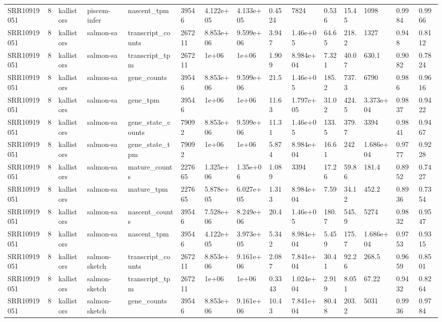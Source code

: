 \begin{tabular}{lllllllllllllll}
SRR10919051 & 8 & kallistors & piscem-infer & nascent\_tpm & 39546 & 4.122e+05 & 4.133e+05 & 0.4524 & 7824 & 0.536 & 15.45 & 1098 & 0.9984 & 0.9966 \\
SRR10919051 & 8 & kallistors & salmon-sa & transcript\_counts & 267211 & 8.853e+06 & 9.599e+06 & 3.947 & 1.46e+05 & 64.65 & 218.2 & 1327 & 0.948 & 0.8112 \\
SRR10919051 & 8 & kallistors & salmon-sa & transcript\_tpm & 267211 & 1e+06 & 1e+06 & 1.909 & 8.984e+04 & 7.321 & 40.07 & 630.1 & 0.9082 & 0.7824 \\
SRR10919051 & 8 & kallistors & salmon-sa & gene\_counts & 39546 & 8.853e+06 & 9.599e+06 & 21.5 & 1.46e+05 & 185.2 & 737.3 & 6790 & 0.986 & 0.9616 \\
SRR10919051 & 8 & kallistors & salmon-sa & gene\_tpm & 39546 & 1e+06 & 1e+06 & 11.63 & 1.797e+05 & 31.02 & 424.5 & 3.373e+04 & 0.9837 & 0.9422 \\
SRR10919051 & 8 & kallistors & salmon-sa & gene\_state\_counts & 79092 & 8.853e+06 & 9.599e+06 & 11.31 & 1.46e+05 & 133.5 & 379.7 & 3394 & 0.9841 & 0.9467 \\
SRR10919051 & 8 & kallistors & salmon-sa & gene\_state\_tpm & 79092 & 1e+06 & 1e+06 & 5.874 & 8.984e+04 & 16.61 & 242 & 1.686e+04 & 0.9777 & 0.9228 \\
SRR10919051 & 8 & kallistors & salmon-sa & mature\_counts & 227665 & 1.325e+06 & 1.35e+06 & 1.089 & 3394 & 17.26 & 59.86 & 181.4 & 0.8952 & 0.7427 \\
SRR10919051 & 8 & kallistors & salmon-sa & mature\_tpm & 227665 & 5.878e+05 & 6.027e+05 & 1.313 & 8.984e+04 & 7.59 & 34.12 & 452.2 & 0.8936 & 0.7354 \\
SRR10919051 & 8 & kallistors & salmon-sa & nascent\_counts & 39546 & 7.528e+06 & 8.249e+06 & 20.4 & 1.46e+05 & 180.7 & 545.9 & 5274 & 0.9832 & 0.9547 \\
SRR10919051 & 8 & kallistors & salmon-sa & nascent\_tpm & 39546 & 4.122e+05 & 3.973e+05 & 5.342 & 8.984e+04 & 5.459 & 175.7 & 1.686e+04 & 0.9753 & 0.9315 \\
SRR10919051 & 8 & kallistors & salmon-sketch & transcript\_counts & 267211 & 8.853e+06 & 9.161e+06 & 2.087 & 7.841e+04 & 30.41 & 92.26 & 268.5 & 0.9659 & 0.8501 \\
SRR10919051 & 8 & kallistors & salmon-sketch & transcript\_tpm & 267211 & 1e+06 & 1e+06 & 0.3343 & 1.024e+04 & 2.919 & 8.051 & 67.22 & 0.9432 & 0.8264 \\
SRR10919051 & 8 & kallistors & salmon-sketch & gene\_counts & 39546 & 8.853e+06 & 9.161e+06 & 10.43 & 7.841e+04 & 80.48 & 203.2 & 5031 & 0.9936 & 0.9784 \\

\end{tabular}
